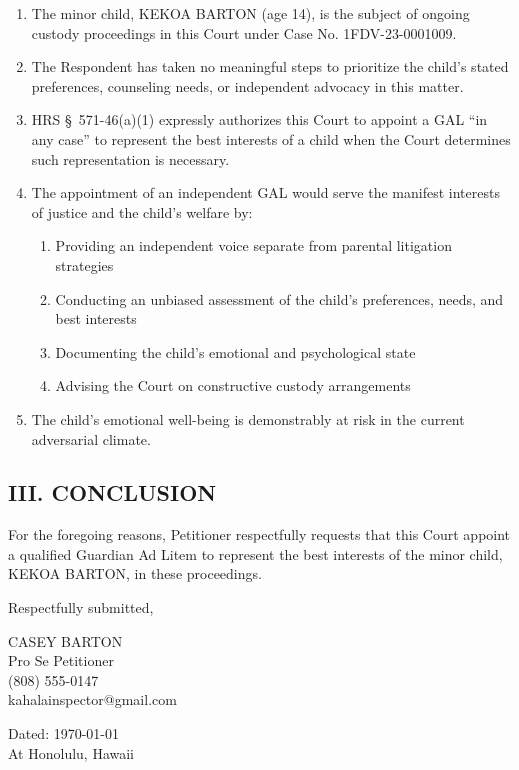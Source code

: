 \documentclass[11pt,letter]{article}
\begin{document}
\begin{enumerate}
\item The minor child, KEKOA BARTON (age 14), is the subject of ongoing custody proceedings in this Court under Case No. 1FDV-23-0001009.

\item The Respondent has taken no meaningful steps to prioritize the child's stated preferences, counseling needs, or independent advocacy in this matter.

\item HRS \S~571-46(a)(1) expressly authorizes this Court to appoint a GAL ``in any case'' to represent the best interests of a child when the Court determines such representation is necessary.

\item The appointment of an independent GAL would serve the manifest interests of justice and the child's welfare by:
  \begin{enumerate}
  \item Providing an independent voice separate from parental litigation strategies
  \item Conducting an unbiased assessment of the child's preferences, needs, and best interests
  \item Documenting the child's emotional and psychological state
  \item Advising the Court on constructive custody arrangements
  \end{enumerate}

\item The child's emotional well-being is demonstrably at risk in the current adversarial climate.

\end{enumerate}

\subsection*{III. CONCLUSION}

For the foregoing reasons, Petitioner respectfully requests that this Court appoint a qualified Guardian Ad Litem to represent the best interests of the minor child, KEKOA BARTON, in these proceedings.

\vspace{0.5cm}

Respectfully submitted,

\vspace{1.5cm}

CASEY BARTON \\
Pro Se Petitioner \\
(808) 555-0147 \\
kahalainspector@gmail.com

\vspace{0.5cm}

Dated: \today{} \\
At Honolulu, Hawaii
\end{document}
